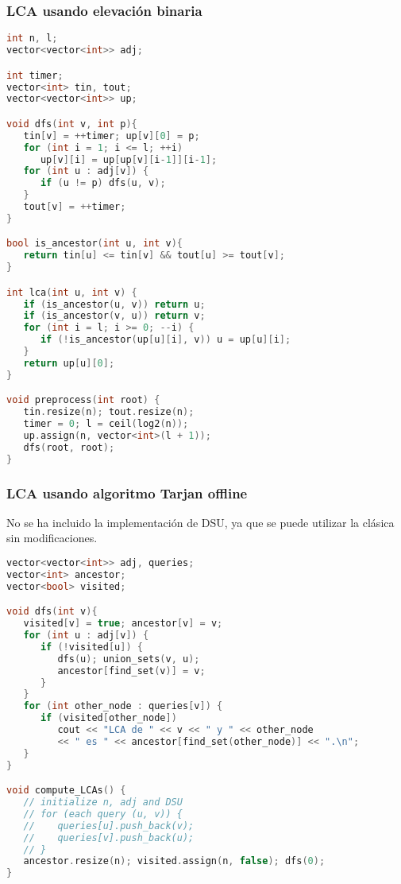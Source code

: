 \subsubsection{LCA usando elevación binaria}
\begin{lstlisting}[language=C++]
int n, l;
vector<vector<int>> adj;

int timer;
vector<int> tin, tout;
vector<vector<int>> up;

void dfs(int v, int p){
   tin[v] = ++timer; up[v][0] = p;
   for (int i = 1; i <= l; ++i)
      up[v][i] = up[up[v][i-1]][i-1];
   for (int u : adj[v]) {
      if (u != p) dfs(u, v);
   }
   tout[v] = ++timer;
}

bool is_ancestor(int u, int v){
   return tin[u] <= tin[v] && tout[u] >= tout[v];
}

int lca(int u, int v) {
   if (is_ancestor(u, v)) return u;
   if (is_ancestor(v, u)) return v;
   for (int i = l; i >= 0; --i) {
      if (!is_ancestor(up[u][i], v)) u = up[u][i];
   }
   return up[u][0];
}

void preprocess(int root) {
   tin.resize(n); tout.resize(n);
   timer = 0; l = ceil(log2(n));
   up.assign(n, vector<int>(l + 1));
   dfs(root, root);
}
\end{lstlisting}

\subsubsection{LCA usando algoritmo Tarjan offline}

No se ha incluido la implementación de DSU, ya que se puede utilizar la clásica sin modificaciones.
\begin{lstlisting}[language=C++]
vector<vector<int>> adj, queries;
vector<int> ancestor;
vector<bool> visited;

void dfs(int v){
   visited[v] = true; ancestor[v] = v;
   for (int u : adj[v]) {
      if (!visited[u]) {
         dfs(u); union_sets(v, u);
         ancestor[find_set(v)] = v;
      }
   }
   for (int other_node : queries[v]) {
      if (visited[other_node])
         cout << "LCA de " << v << " y " << other_node
         << " es " << ancestor[find_set(other_node)] << ".\n";
   }
}

void compute_LCAs() {
   // initialize n, adj and DSU
   // for (each query (u, v)) {
   //    queries[u].push_back(v);
   //    queries[v].push_back(u);
   // }
   ancestor.resize(n); visited.assign(n, false); dfs(0);
}
\end{lstlisting}

